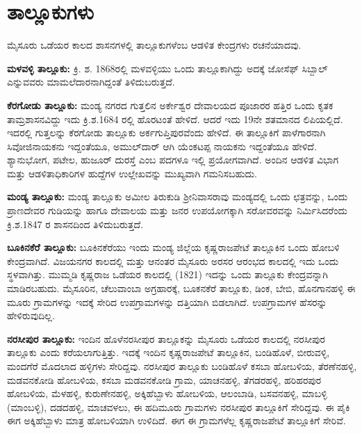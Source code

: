 \section{ತಾಲ್ಲೂಕುಗಳು}

ಮೈಸೂರು ಒಡೆಯರ ಕಾಲದ ಶಾಸನಗಳಲ್ಲಿ ತಾಲ್ಲೂಕುಗಳೆಂಬ ಆಡಳಿತ ಕೇಂದ್ರಗಳು ರಚನೆಯಾದವು.

\textbf{ಮಳವಳ್ಳಿ ತಾಲ್ಲೂಕು:} ಕ್ರಿ. ಶ. 1868ರಲ್ಲಿ ಮಳವಳ್ಳಿಯು ಒಂದು ತಾಲ್ಲೂಕಾಗಿದ್ದು ಅದಕ್ಕೆ ಜೋಸೆಫ್​ ಸಿಬ್ಬಾಲ್​ ಎನ್ನುವವರು ಮಾಮಲೆದಾರ\-ನಾಗಿದ್ದಂತೆ ತಿಳಿದುಬರುತ್ತದೆ.

\newpage

\textbf{ಕೆರಗೋಡು ತಾಲ್ಲೂಕು:} ಮಂಡ್ಯ ನಗರದ ಗುತ್ತಲಿನ ಅರ್ಕೇಶ್ವರ ದೇವಾಲಯದ ಪೂಜಾರರ ಹತ್ತಿರ ಒಂದು ಕೃತಕ ತಾಮ್ರಶಾಸನವಿದ್ದು ಇದು ಕ್ರಿ.ಶ.1684 ರಲ್ಲಿ ಹೊರಟಂತೆ ಹೇಳಿದೆ. ಆದರೆ ಇದು 19ನೇ ಶತಮಾನದ ಲಿಪಿಯಲ್ಲಿದೆ. ಇದರಲ್ಲಿ ಗುತ್ತಲನ್ನು ಕೆರಗೋಡು ತಾಲ್ಲೂಕು ಅರ್ಕಗುಪ್ತಿಪುರವೆಂದು ಹೇಳಿದೆ. ಈ ತಾಲ್ಲೂಕಿಗೆ ಪಾಳೆಗಾರನಾಗಿ ಸಿವೋಜಿನಾಯಕನು ಇದ್ದಂತೆಯೂ, ಅಮುಲ್​ದಾರ್​ ಆಗಿ ಯೆಂಕಟಪ್ಪ ನಾಯಕನು ಇದ್ದಂತೆಯೂ ಹೇಳಿದೆ. ಶ್ಯಾನುಭೋಗ, ಪಟೇಲ, ಹುಜೂರ್​ ದುರಸ್ತೆ ಎಂಬ ಪದಗಳೂ ಇಲ್ಲಿ ಪ್ರಯೋಗವಾಗಿದೆ. ಅಂದಿನ ಆಡಳಿತ ವಿಭಾಗ ಮತ್ತು ಆಡಳಿತಾಧಿಕಾರಿಗಳ ಹುದ್ದೆಗಳ ಉಲ್ಲೇಖವನ್ನು ಮುಖ್ಯವಾಗಿ ಗಮನಿಸಬಹುದು.

\textbf{ಮಂಡ್ಯ ತಾಲ್ಲೂಕು: }ಮಂಡ್ಯ ತಾಲ್ಲೂಕು ಅಮೀಲ ತಿರುಕುಡಿ ಶ‍್ರೀನಿವಾಸರಾವು ಮಂಡ್ಯದಲ್ಲಿ ಒಂದು ಛತ್ರವನ್ನು, ಒಂದು ಪ್ರಾಣದೇವರ ಗುಡಿಯನ್ನು ಹಾಗೂ ದೇವಾಲಯ ಮತ್ತು ಜನರ ಉಪಯೋಗಕ್ಕಾಗಿ ಸರೋವರವನ್ನು ನಿರ್ಮಿಸಿದರೆಂದು ಕ್ರಿ.ಶ.1847 ರ ಶಾಸನದಿಂದ ತಿಳಿದುಬರುತ್ತದೆ.

\textbf{ಬೂಕಿನಕೆರೆ ತಾಲ್ಲೂಕು:} ಬೂಕಿನಕೆರೆಯು ಇಂದು ಮಂಡ್ಯ ಜಿಲ್ಲೆಯ ಕೃಷ್ಣರಾಜಪೇಟೆ ತಾಲ್ಲೂಕಿನ ಒಂದು ಹೋಬಳಿ ಕೇಂದ್ರವಾಗಿದೆ. ವಿಜಯನಗರ ಕಾಲದಲ್ಲಿ ಮತ್ತು ಆನಂತರ ಮೈಸೂರು ಅರಸರ ಆರಂಭದ ಕಾಲದಲ್ಲಿ ಇದು ಒಂದು ಸ್ಥಳವಾಗಿತ್ತು. ಮುಮ್ಮಡಿ ಕೃಷ್ಣರಾಜ ಒಡೆಯರ ಕಾಲದಲ್ಲಿ (1821) ಇದನ್ನು ಒಂದು ತಾಲ್ಲೂಕು ಕೇಂದ್ರವನ್ನಾಗಿ ಮಾಡಿರಬಹುದು. ಮೈಸೂರಿನ, ಚೆಲುವಾಂಬಾ ಅಗ್ರಹಾರಕ್ಕೆ, ಬೂಕನಕೆರೆ ತಾಲ್ಲೂಕು, ಡಿಂಕ, ಬೇಬಿ, ಹೊನಗಾನಹಳ್ಳಿ ಈ ಮೂರು ಗ್ರಾಮಗಳನ್ನು ಇದಕ್ಕೆ ಸೇರಿದ ಉಪಗ್ರಾಮಗಳನ್ನು ದತ್ತಿಯಾಗಿ ಬಿಡಲಾಗಿದೆ. ಉಪಗ್ರಾಮಗಳ ಹೆಸರನ್ನು ಹೇಳಿರುವುದಿಲ್ಲ.

\textbf{ನರಸೀಪುರ ತಾಲ್ಲೂಕು:} ಇಂದಿನ ಹೊಳೆನರಸೀಪುರ ತಾಲ್ಲೂಕನ್ನು ಮೈಸೂರು ಒಡೆಯರ ಕಾಲದಲ್ಲಿ ನರಸೀಪುರ ತಾಲ್ಲೂಕು ಎಂದು ಕರೆಯಲಾಗುತ್ತಿತ್ತು. ಇದಕ್ಕೆ ಇಂದಿನ ಕೃಷ್ಣರಾಜಪೇಟೆ ತಾಲ್ಲೂಕಿನ, ಬಂಡಿಹೊಳೆ, ಬೀರುವಳ್ಳಿ, ಮಂದಗೆರೆ ಮೊದಲಾದ ಹಳ್ಳಿಗಳು ಸೇರಿದ್ದವು. ನರಸೀಪುರ ತಾಲ್ಲೂಕು ಬಂಡಿಹೊಳೆ ಕಸಬಾ ಹೋಬಳಿಯ, ತೆರಣೆನಹಳ್ಳಿ, ಮಡವನಕೋಡಿ ಹೋಬಳಿಯ, ಕಸಬಾ ಮಡವನಕೋಡಿ ಗ್ರಾಮ, ಯಾಚನಹಳ್ಳಿ, ತೆಗಡರಹಳ್ಳಿ, ಹರಿಹರಪುರ ಹೋಬಳಿಯ, ಮೆಳಹಳ್ಳಿ, ಕುರುಣೇನಹಳ್ಳಿ, ಅಕ್ಕಿಹೆಬ್ಬಾಳು ಹೋಬಳಿಯ, ಆಲಂಬಾಡಿ, ಬಸವನಹಳ್ಳಿ, ಮಾಬಳ್ಳಿ (ಮಾಂಬಳ್ಳಿ), ದಡದಹಳ್ಳಿ, ಮಾಚವಳಲು, ಈ ಹದಿಮೂರು ಗ್ರಾಮಗಳು ನರಸೀಪುರ ತಾಲ್ಲೂಕಿಗೆ ಸೇರಿದ್ದವು. ಈ ಪೈಕಿ ಈಗ ಅಕ್ಕಿಹೆಬ್ಬಾಳು ಮಾತ್ರ ಹೋಬಳಿಯಾಗಿ ಉಳಿದಿದೆ. ಈಗ ಈ ಗ್ರಾಮಗಳೆಲ್ಲ ಕೃಷ್ಣರಾಜಪೇಟೆ ತಾಲ್ಲೂಕಿಗೆ ಸೇರಿವೆ.

